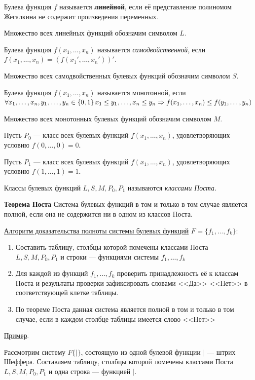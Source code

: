 \dftion Булева функция $f$ называется \textbf{линейной}, если её представление полиномом Жегалкина не содержит произведения переменных.

Множество всех линейных функций обозначим символом $L$.

\dftion Булева функция $f(x_1,\dots,x_n)$ называется \textit{самодвойственной}, если $f(x_1,\dots,x_n)=(f(x_1',\dots,x_n'))'$.

Множество всех самодвойственных булевых функций обозначим символом $S$.

\dftion Булева функция $f(x_1,\dots,x_n)$ называется монотонной, если $\forall x_1, \dots, x_n, y_1, \dots, y_n \in \{0,1\} \, x_1 \leq y_1, \dots, x_n \leq y_n \Rightarrow f(x_1,\dots,x_n) \leq f(y_1,\dots,y_n)$

Множество всех монотонных булевых функций обозначим символом $M$.

Пусть $P_0$ --- класс всех булевых функций $f(x_1,\dots,x_n)$, удовлетворяющих условию $f(0,\dots,0)=0$.

Пусть $P_1$ --- класс всех булевых функций $f(x_1,\dots,x_n)$, удовлетворяющих условию $f(1,\dots,1)=1$.

\dftion Классы булевых функций $L, S, M, P_0, P_1$ называются \textit{классами Поста}.

\textbf{Теорема Поста} Система булевых функций в том и только в том случае является полной, если она не содержится ни в одном из классов Поста.

\underline{Алгоритм доказательства полноты системы булевых функций} $F = \{f_1,\dots,f_k\}$:
\begin{enumerate}
    \item Составить таблицу, столбцы которой помечены классами Поста $L, S, M, P_0, P_1$ и строки --- функциями системы $f_1, \dots, f_k$
    \item Для каждой из функций $f_1, \dots, f_k$ проверить принадлежность её к классам Поста и результаты проверки зафиксировать словами <<Да>> <<Нет>> в соответствующей клетке таблицы.
    \item По теореме Поста данная система является полной в том и только в том случае, если в каждом столбце таблицы имеется слово <<Нет>>
\end{enumerate}

\underline{Пример}.

Рассмотрим систему $F\{|\}$, состоящую из одной булевой функции $|$ --- штрих Шеффера. Составляем таблицу, столбцы которой помечены классами Поста $L, S, M, P_0, P_1$ и одна строка --- функцией $|$.

